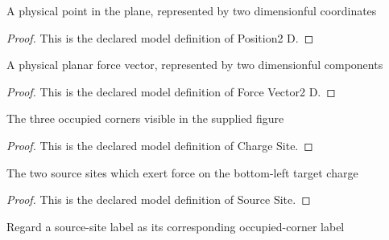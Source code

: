 \begin{definition}[Position2 D]
  \label{def:physics:phyx-mini-0897:phyxminiproblems-problemphyxmini0897-position2d}
  A physical point in the plane, represented by two dimensionful coordinates
\end{definition}
\begin{proof}
  This is the declared model definition of Position2 D.
\end{proof}
\begin{definition}
  \label{def:physics:phyx-mini-0897:phyxminiproblems-problemphyxmini0897-forcevector2d}
  A physical planar force vector, represented by two dimensionful components
\end{definition}
\begin{proof}
  This is the declared model definition of Force Vector2 D.
\end{proof}
\begin{definition}
  \label{def:physics:phyx-mini-0897:phyxminiproblems-problemphyxmini0897-chargesite}
  The three occupied corners visible in the supplied figure
\end{definition}
\begin{proof}
  This is the declared model definition of Charge Site.
\end{proof}
\begin{definition}
  \label{def:physics:phyx-mini-0897:phyxminiproblems-problemphyxmini0897-sourcesite}
  The two source sites which exert force on the bottom-left target charge
\end{definition}
\begin{proof}
  This is the declared model definition of Source Site.
\end{proof}
\begin{definition}
  \label{def:physics:phyx-mini-0897:phyxminiproblems-problemphyxmini0897-sourcesite-chargesite}
  Regard a source-site label as its corresponding occupied-corner label
\end{definition}

